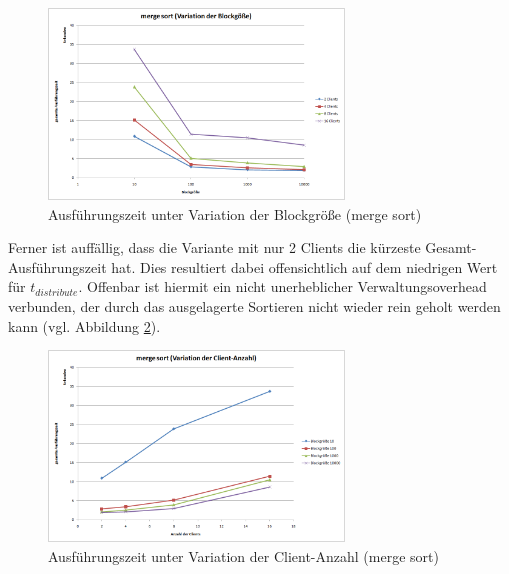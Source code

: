 \documentclass[fontsize=12pt,a4paper,headinclude=no,headings=small]{scrartcl}
\begin{document}
\begin{figure}[H]
	\centering
	\includegraphics[width=0.7\textwidth]{results/sort/diagrams/block_ms.png}
	\caption{Ausführungszeit unter Variation der Blockgröße (merge sort)}
	\label{fig.ms.compare.blocksize}
\end{figure}
 
Ferner ist auffällig, dass die Variante mit nur 2 Clients die kürzeste Gesamt-Ausführungszeit hat. Dies resultiert dabei offensichtlich auf dem niedrigen Wert für $t_{distribute}$. Offenbar ist hiermit ein nicht unerheblicher Verwaltungsoverhead verbunden, der durch das ausgelagerte Sortieren nicht wieder rein geholt werden kann (vgl. Abbildung \ref{fig.ms.compare.clientcount}).

\begin{figure}[H]
	\centering
	\includegraphics[width=0.7\textwidth]{results/sort/diagrams/clients_ms.png}
	\caption{Ausführungszeit unter Variation der Client-Anzahl (merge sort)}
	\label{fig.ms.compare.clientcount}
\end{figure}
\end{document}
